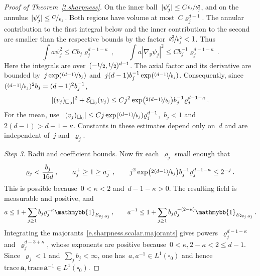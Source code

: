 \documentclass[11pt,letterpaper]{article}
\numberwithin{equation}{section}
\theoremstyle{definition}
\renewcommand{\a}{\mathbf{a}}
\newcommand{\nf}{\nicefrac}
\newcommand{\cu}{\square}
\newcommand*{\tr}{\mathrm{trace\,}}
\newcommand{\indc}{{\mathmybb{1}}}
\newcommand{\Ener}{\mathcal E}
\begin{document}
\begin{proof}[Proof of Theorem~\ref{t.sharpness}]
\smallskip
On the inner ball~$|\psi_j'|\leq C\nf{\varrho_j}{b_j^2}$, and on the annulus~$|\psi_j'|\leq\nf C{\varrho_j}$. Both regions have volume at most~$C\varrho_j^{d-1}$. The annular contribution to the first integral below and the inner contribution to the second are smaller than the respective bounds by the factor~$\nf{\varrho_j^2}{b_j^2}<1$. Thus
\begin{equation*}
	\int a\psi_j^2\leq Cb_j\varrho_j^{d-1-\kappa}\,,\qquad\int a|\nabla_y\psi_j|^2\leq Cb_j^{-1}\varrho_j^{d-1-\kappa}\,.
\end{equation*}
Here the integrals are over~$(-\nf12,\nf12)^{d-1}$. The axial factor and its derivative are bounded by~$j\exp(\nf{(d-1)}{b_j})$ and~$j(d-1)b_j^{-1}\exp(\nf{(d-1)}{b_j})$. Consequently, since~$(\nf{(d-1)}{b_j})^2b_j=(d-1)^2b_j^{-1}$,
\begin{equation}
	|(v_j)_{\cu_0}|^2+\Ener_{\cu_0}(v_j)\leq Cj^2\exp\bigl(\nf{2(d-1)}{b_j}\bigr)b_j^{-1}\varrho_j^{d-1-\kappa}\,.
	\label{e.sharpness.scalar.summability}
\end{equation}
For the mean, use~$|(v_j)_{\cu_0}|\leq Cj\exp(\nf{(d-1)}{b_j})\varrho_j^{d-1}$,~$b_j<1$ and~$2(d-1)>d-1-\kappa$. Constants in these estimates depend only on~$d$ and are independent of~$j$ and~$\varrho_j$.

\smallskip
\emph{Step 3.} Radii and coefficient bounds. Now fix each~$\varrho_j$ small enough that
\begin{equation}
	\varrho_j<\frac{b_j}{16d}\,,\qquad a_j^+\geq1\geq a_j^-\,,\qquad j^2\exp\bigl(\nf{2(d-1)}{b_j}\bigr)b_j^{-1}\varrho_j^{d-1-\kappa}\leq2^{-j}\,.
	\label{e.sharpness.scalar.radii}
\end{equation}
This is possible because~$0<\kappa<2$ and~$d-1-\kappa>0$. The resulting field is measurable and positive, and
\begin{equation}
	a\leq1+\sum_{j\geq1}b_j\varrho_j^{-\kappa}\indc_{E_{\varrho_j,y_j}}\,,\qquad a^{-1}\leq1+\sum_{j\geq1}b_j\varrho_j^{-(2-\kappa)}\indc_{E_{2\varrho_j,y_j}}\,.
	\label{e.sharpness.scalar.majorants}
\end{equation}
Integrating the majorants~\eqref{e.sharpness.scalar.majorants} gives powers~$\varrho_j^{d-1-\kappa}$ and~$\varrho_j^{d-3+\kappa}$, whose exponents are positive because~$0<\kappa,2-\kappa<2\leq d-1$. Since~$\varrho_j<1$ and~$\sum_jb_j<\infty$, one has~$a,a^{-1}\in L^1(\cu_0)$ and hence~$\tr\a,\tr\a^{-1}\in L^1(\cu_0)$.


\end{proof}
\end{document}

